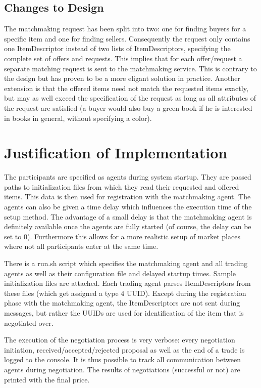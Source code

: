 \documentclass[a4paper,11pt]{article}
\begin{document}
\subsection{Changes to Design}
The matchmaking request has been split into two: one for finding buyers for a specific item and one for finding sellers. Consequently the request only contains one ItemDescriptor instead of two lists of ItemDescriptors, specifying the complete set of offers and requests. This implies that for each offer/request a separate matching request is sent to the matchmaking service. This is contrary to the design but has proven to be a more eligant solution in practice. Another extension is that the offered items need not match the requested items exactly, but may as well exceed the specification of the request as long as all attributes of the request are satisfied (a buyer would also buy a green book if he is interested in books in general, without specifying a color).

\section{Justification of Implementation}
The participants are specified as agents during system startup. They are passed paths to initialization files from which they read their requested and offered items. This data is then used for registration with the matchmaking agent. The agents can also be given a time delay which influences the execution time of the setup method. The advantage of a small delay is that the matchmaking agent is definitely available once the agents are fully started (of course, the delay can be set to 0). Furthermore this allows for a more realistic setup of market places where not all participants enter at the same time.

There is a run.sh script which specifies the matchmaking agent and all trading agents as well as their configuration file and delayed startup times. Sample initialization files are attached. Each trading agent parses ItemDescriptors from these files (which get assigned a type 4 UUID). Except during the registration phase with the matchmaking agent, the ItemDescriptors are not sent during messages, but rather the UUIDs are used for identification of the item that is negotiated over.

The execution of the negotiation process is very verbose: every negotiation initiation, received/accepted/rejected proposal as well as the end of a trade is logged to the console. It is thus possible to track all communication between agents during negotiation. The results of negotiations (successful or not) are printed with the final price.
\end{document}
